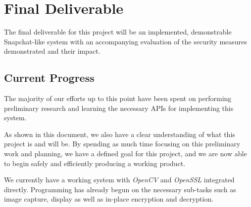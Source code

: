 \documentclass[11pt, a4paper,titlepage]{report}
\begin{document}
\chapter{Final Deliverable}
The final deliverable for this project will be an implemented, demonstrable Snapchat-like system with an accompanying evaluation of the security measures demonstrated and their impact.
\section{Current Progress}
The majority of our efforts up to this point have been spent on performing preliminary research and learning the necessary APIs for implementing this system.

As shown in this document, we also have a clear understanding of what this project is and will be. By spending as much time focusing on this preliminary work and planning, we have a defined goal for this project, and we are now able to begin safely and efficiently producing a working product.

We currently have a working system with \emph{OpenCV} and \emph{OpenSSL} integrated directly. Programming has already begun on the necessary sub-tasks such as image capture, display as well as in-place encryption and decryption.


\printbibliography 
\nocite{*}
\end{document}
